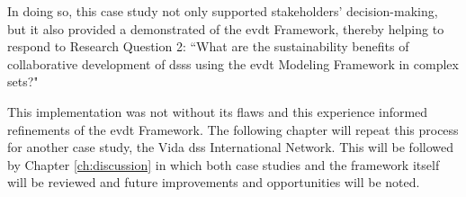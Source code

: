 In doing so, this case study not only supported stakeholders' decision-making, but it also provided a demonstrated of the \ac{evdt} Framework, thereby helping to respond to Research Question 2: ``What are the sustainability benefits of collaborative development of \acp{dss} using the \acf{evdt} Modeling Framework in complex \acf{sets}?"

This implementation was not without its flaws and this experience informed refinements of the \ac{evdt} Framework. The following chapter will repeat this process for another case study, the Vida \ac{dss} International Network. This will be followed by Chapter \ref{ch:discussion} in which both case studies and the framework itself will be reviewed and future improvements and opportunities will be noted.




